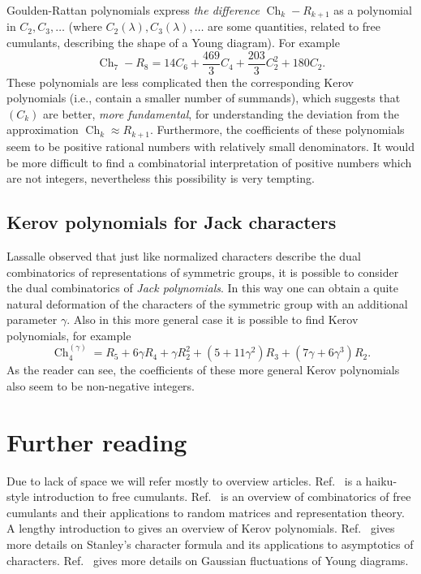 \documentclass{emsprocart}
\theoremstyle{definition}
\begin{document}
Goulden-Rattan polynomials express \emph{the difference} $\operatorname{Ch}_{k}-R_{k+1}$ as a polynomial in $C_2,C_3,\dots$
(where  $C_2(\lambda),C_3(\lambda),\dots$  are some quantities, related to free cumulants, describing the shape of a Young diagram).
For example
$$ \operatorname{Ch}_7 - R_8 = 14 C_6 + \frac{469}{3} C_4 + \frac{203}{3}
C_2^2 + 180 C_2. $$
These polynomials are less complicated then the corresponding Kerov polynomials 
(i.e., contain a smaller number of summands), which suggests that $(C_k)$ are better, \emph{more fundamental},
for understanding the deviation from the approximation $\operatorname{Ch}_{k}\approx R_{k+1}$. Furthermore, the coefficients
of these polynomials seem to be positive rational numbers with relatively small denominators. 
It would be more difficult to find a combinatorial interpretation of positive numbers which are not integers,
nevertheless this possibility is very tempting.

\subsection{Kerov polynomials for Jack characters}
Lassalle observed that just like normalized characters describe the dual combinatorics
of representations of symmetric groups, it is possible to consider the dual combinatorics of \emph{Jack polynomials}.
In this way one can obtain a quite natural deformation of the characters of the symmetric group
with an additional parameter $\gamma$. Also in this more general case it is possible to find Kerov polynomials, for example
$$    \operatorname{Ch}^{(\gamma)}_{4} = R_5 + 6\gamma R_4 + \gamma R_2^2 + (5 + 11\gamma^2)R_3 + (7\gamma +
6\gamma^3)R_2.$$
As the reader can see, the coefficients of these more general Kerov polynomials also seem to be non-negative integers.

\section{Further reading}

Due to lack of space we will refer mostly to overview articles.
Ref.~\cite{Novak'Sniady2011} is a haiku-style introduction to free cumulants.
Ref.~\cite{Biane2002} is an overview of combinatorics of free cumulants and their applications
to random matrices and representation theory.
A lengthy introduction to \cite{DolkegaF'eray'Sniady2010} gives an overview of  Kerov polynomials.
Ref.~\cite{F'eray'Sniady2011} gives more details on Stanley's character formula and its applications
to asymptotics of characters. Ref.~\cite{'Sniady2006} gives more details on Gaussian fluctuations of Young diagrams.
\end{document}
